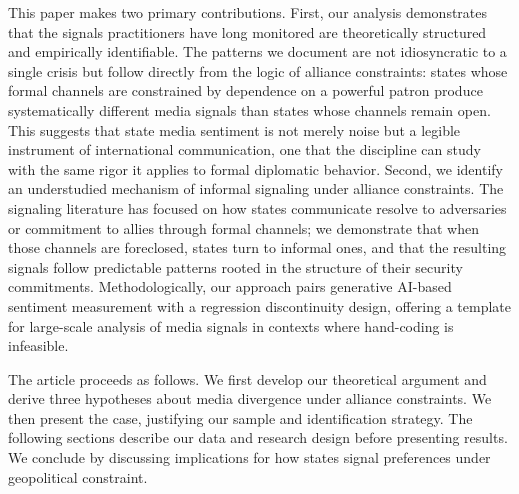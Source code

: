 \documentclass[12pt]{article}
\begin{document}
This paper makes two primary contributions. First, our analysis demonstrates that the signals practitioners have long monitored are theoretically structured and empirically identifiable. The patterns we document are not idiosyncratic to a single crisis but follow directly from the logic of alliance constraints: states whose formal channels are constrained by dependence on a powerful patron produce systematically different media signals than states whose channels remain open. This suggests that state media sentiment is not merely noise but a legible instrument of international communication, one that the discipline can study with the same rigor it applies to formal diplomatic behavior. Second, we identify an understudied mechanism of informal signaling under alliance constraints. The signaling literature has focused on how states communicate resolve to adversaries or commitment to allies through formal channels; we demonstrate that when those channels are foreclosed, states turn to informal ones, and that the resulting signals follow predictable patterns rooted in the structure of their security commitments. Methodologically, our approach pairs generative AI-based sentiment measurement with a regression discontinuity design, offering a template for large-scale analysis of media signals in contexts where hand-coding is infeasible.
 
The article proceeds as follows. We first develop our theoretical argument and derive three hypotheses about media divergence under alliance constraints. We then present the case, justifying our sample and identification strategy. The following sections describe our data and research design before presenting results. We conclude by discussing implications for how states signal preferences under geopolitical constraint.


\end{document}
